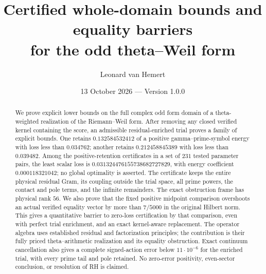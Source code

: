 \documentclass[12pt]{article}
\title{Certified whole-domain bounds and equality barriers\protect\\
for the odd theta--Weil form}
\author{Leonard van Hemert}
\date{13 October 2026 --- Version 1.0.0}
\theoremstyle{remark}\newtheorem{remark}[theorem]{Remark}
\begin{document}
\maketitle
\begin{abstract}
We prove explicit lower bounds on the full complex odd form domain of
a theta-weighted realization of the Riemann--Weil form. After removing
any closed verified kernel containing the score, an admissible residual-enriched trial proves a family of explicit bounds.
One retains $0.132584532412$ of a positive gamma--prime-symbol energy
with loss less than $0.034762$; another retains $0.212458845389$
with loss less than $0.039482$. Among the positive-retention certificates in a set of $231$ tested
parameter pairs, the least scalar loss is $0.031324476155738682727829$, with energy
coefficient $0.000118321042$; no global optimality is asserted. The certificate keeps the
entire physical residual Gram, its coupling outside the trial space,
all prime powers, the contact and pole terms, and the infinite remainders.
The exact obstruction frame has physical rank $56$. We also prove that
the fixed positive midpoint comparison overshoots an actual verified
equality vector by more than $7/5000$ in the original Hilbert norm.
This gives a quantitative barrier to zero-loss certification by that
comparison, even with perfect trial enrichment, and an exact kernel-aware
replacement. The operator algebra uses established residual and
factorization principles; the contribution is their fully priced
theta--arithmetic realization and its equality obstruction. Exact continuum cancellation also gives a complete signed-action
error below $11\cdot10^{-6}$ for the enriched trial, with every prime
tail and pole retained. No zero-error positivity, even-sector conclusion,
or resolution of RH is claimed.
\end{abstract}
\end{document}
